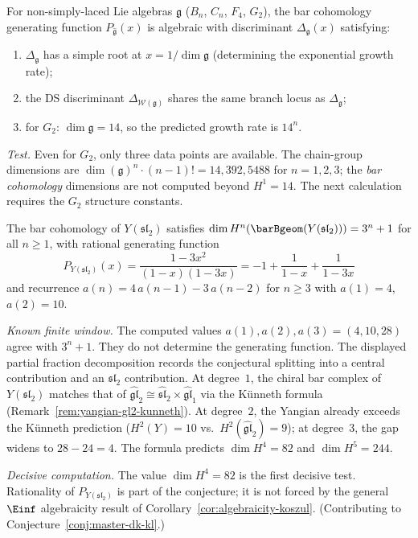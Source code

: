 \begin{conjecture}
\label{conj:non-simply-laced-discriminant}
For non-simply-laced Lie algebras $\mathfrak{g}$ ($B_n$, $C_n$, $F_4$, $G_2$), the bar cohomology generating function $P_{\widehat{\mathfrak{g}}}(x)$ is algebraic with discriminant $\Delta_{\mathfrak{g}}(x)$ satisfying:
\begin{enumerate}[label=\textup{(\roman*)}]
\item $\Delta_{\mathfrak{g}}$ has a simple root at $x = 1/\dim\mathfrak{g}$ (determining the exponential growth rate);
\item the DS discriminant $\Delta_{\mathcal{W}(\mathfrak{g})}$ shares the same branch locus as $\Delta_{\mathfrak{g}}$;
\item for $G_2$: $\dim\mathfrak{g} = 14$, so the predicted growth rate is $14^n$.
\end{enumerate}

\emph{Test.} Even for $G_2$, only three data points are available.
The chain-group dimensions are
$\dim(\mathfrak{g})^n \cdot (n{-}1)! = 14, 392, 5488$
for $n = 1, 2, 3$; the \emph{bar cohomology} dimensions are
not computed beyond $H^1 = 14$. The next calculation requires
the $G_2$ structure constants.
\end{conjecture}

\begin{conjecture}
\label{conj:yangian-bar-gf}
The bar cohomology of $Y(\mathfrak{sl}_2)$ satisfies
$\dim H^n(\barBgeom(Y(\mathfrak{sl}_2))) = 3^n + 1$ for all $n \geq 1$,
with rational generating function
\begin{equation}P_{Y(\mathfrak{sl}_2)}(x) = \frac{1 - 3x^2}{(1-x)(1-3x)}
= -1 + \frac{1}{1-x} + \frac{1}{1-3x}
\end{equation}
and recurrence $a(n) = 4\,a(n{-}1) - 3\,a(n{-}2)$ for $n \geq 3$
with $a(1) = 4$, $a(2) = 10$.

\emph{Known finite window.} The computed values
$a(1),a(2),a(3)=(4,10,28)$ agree with $3^n+1$. They do not determine
the generating function. The displayed partial fraction decomposition
records the conjectural splitting into a central contribution and an
$\mathfrak{sl}_2$ contribution. At degree~$1$, the chiral bar complex
of $Y(\mathfrak{sl}_2)$ matches that of
$\widehat{\mathfrak{gl}}_2 \cong \widehat{\mathfrak{sl}}_2
\times \widehat{\mathfrak{gl}}_1$ via the K\"unneth formula
(Remark~\ref{rem:yangian-gl2-kunneth}). At degree~$2$, the Yangian
already exceeds the K\"unneth prediction
($H^2(Y) = 10$ vs.\ $H^2(\widehat{\mathfrak{gl}}_2) = 9$);
at degree~$3$, the gap widens to $28 - 24 = 4$. The formula predicts
$\dim H^4 = 82$ and $\dim H^5 = 244$.

\emph{Decisive computation.} The value $\dim H^4=82$ is the first
decisive test. Rationality of $P_{Y(\mathfrak{sl}_2)}$ is part of
the conjecture; it is not forced by the general $\Einf$ algebraicity
result of Corollary~\ref{cor:algebraicity-koszul}.
(Contributing to Conjecture~\ref{conj:master-dk-kl}.)
\end{conjecture}

